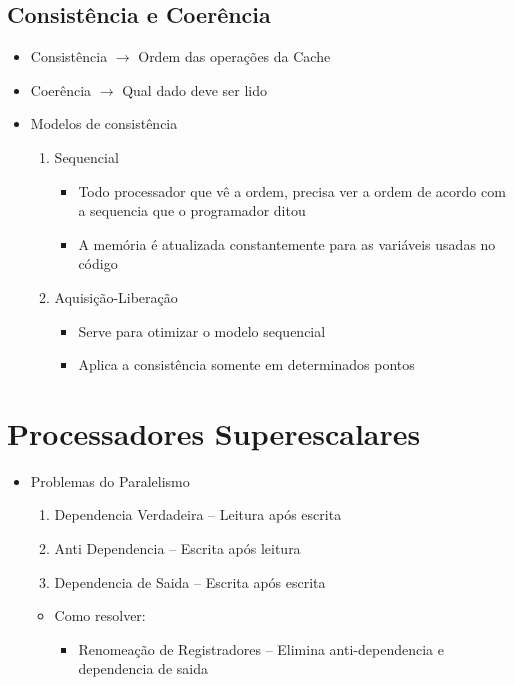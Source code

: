 \documentclass[12pt]{article}
\begin{document}
\subsection{Consistência e Coerência}
\begin{itemize}
    \item Consistência $\rightarrow$ Ordem das operações da Cache
    \item Coerência $\rightarrow$ Qual dado deve ser lido
    
    \item Modelos de consistência
    \begin{enumerate}
        \item Sequencial
        \begin{itemize}
            \item Todo processador que vê a ordem, precisa ver a ordem de acordo 
            com a sequencia que o programador ditou
            \item A memória é atualizada constantemente para as variáveis usadas 
            no código
        \end{itemize}
        \item Aquisição-Liberação
        \begin{itemize}
            \item Serve para otimizar o modelo sequencial
            \item Aplica a consistência somente em determinados pontos
        \end{itemize}
    \end{enumerate}
\end{itemize}


\section{Processadores Superescalares}
\begin{itemize}
    \item Problemas do Paralelismo
    \begin{enumerate}
        \item Dependencia Verdadeira -- Leitura após escrita
        \item Anti Dependencia -- Escrita após leitura
        \item Dependencia de Saida -- Escrita após escrita
    \end{enumerate}
    \begin{itemize}
        \item Como resolver:
        \begin{itemize}
            \item Renomeação de Registradores -- Elimina anti-dependencia e 
            dependencia de saida 
        \end{itemize}
    \end{itemize}
\end{itemize}
\end{document}
